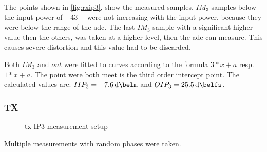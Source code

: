\documentclass[12pt,a4paper,parskip=full,abstracton]{scrartcl}
\begin{document}
The points shown in \cref{fig:rxip3}, show the measured samples. $IM_3$-samples
below the input power of \SI{-43}{\deci\belm} were not increasing with the input
power, because they were below the range of the \gls{adc}. The last $IM_3$ sample
with a significant higher value then the others, was taken at a higher level, then
the \gls{adc} can measure. This causes severe distortion and this value had to be
discarded.

Both $IM_3$ and $out$ were fitted to curves according to the formula $3*x+a$ resp.
$1*x+a$. The point were both meet is the third order intercept point. The calculated
values are: $IIP_3 = \SI{-7.6}{\deci\belm}$ and $OIP_3 = \SI{25.5}{\deci\belfs}$.

\subsubsection{TX}
\label{sec:iptx}
\begin{figure}[htb]
    \centering
    \caption{\gls{tx} IP3 measurement setup}
    \label{fig:txipsetup}
\end{figure}

Multiple measurements with random phases were taken.
\end{document}
